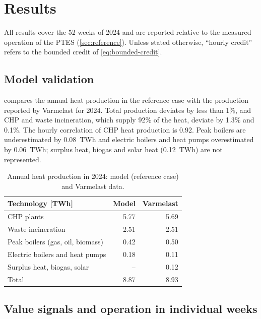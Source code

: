 \section{Results}
\label{sec:results}

All results cover the 52 weeks of 2024 and are reported relative to the measured operation of the PTES (\cref{sec:reference}). Unless stated otherwise, ``hourly credit'' refers to the bounded credit of \cref{eq:bounded-credit}.

\subsection{Model validation}
\label{sec:validation}

 compares the annual heat production in the reference case with the production reported by Varmelast for 2024. Total production deviates by less than 1\%, and CHP and waste incineration, which supply 92\% of the heat, deviate by 1.3\% and 0.1\%. The hourly correlation of CHP heat production is 0.92. Peak boilers are underestimated by 0.08~TWh and electric boilers and heat pumps overestimated by 0.06~TWh; surplus heat, biogas and solar heat (0.12~TWh) are not represented.

\begin{table}[!htb]
    \centering
    \small
    \caption{Annual heat production in 2024: model (reference case) and Varmelast data.}
    \label{tab:validation}
    \begin{tabular}{lrr}
        \toprule
        Technology [TWh] & Model & Varmelast \\
        \midrule
        CHP plants & 5.77 & 5.69 \\
        Waste incineration & 2.51 & 2.51 \\
        Peak boilers (gas, oil, biomass) & 0.42 & 0.50 \\
        Electric boilers and heat pumps & 0.18 & 0.11 \\
        Surplus heat, biogas, solar & -- & 0.12 \\
        \midrule
        Total & 8.87 & 8.93 \\
        \bottomrule
    \end{tabular}
\end{table}

\subsection{Value signals and operation in individual weeks}
\label{sec:results-weeks}

